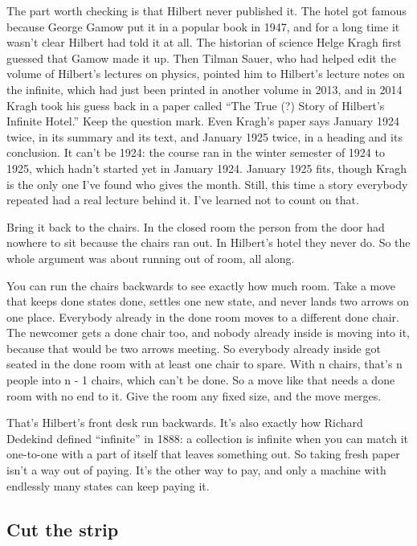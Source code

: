 \documentclass[11pt,twoside]{article}
\theoremstyle{thielethm}
\theoremstyle{thieledef}
\theoremstyle{thieledef}
\theoremstyle{thieledef}
\theoremstyle{thielethm}
\theoremstyle{thieleobs}
\theoremstyle{thielethm}
\begin{document}
The part worth checking is that Hilbert never published it. The hotel got famous because George Gamow put it in a popular book in 1947, and for a long time it wasn't clear Hilbert had told it at all. The historian of science Helge Kragh first guessed that Gamow made it up. Then Tilman Sauer, who had helped edit the volume of Hilbert's lectures on physics, pointed him to Hilbert's lecture notes on the infinite, which had just been printed in another volume in 2013, and in 2014 Kragh took his guess back in a paper called ``The True (?) Story of Hilbert's Infinite Hotel.'' Keep the question mark. Even Kragh's paper says January 1924 twice, in its summary and its text, and January 1925 twice, in a heading and its conclusion. It can't be 1924: the course ran in the winter semester of 1924 to 1925, which hadn't started yet in January 1924. January 1925 fits, though Kragh is the only one I've found who gives the month. Still, this time a story everybody repeated had a real lecture behind it. I've learned not to count on that.

Bring it back to the chairs. In the closed room the person from the door had nowhere to sit because the chairs ran out. In Hilbert's hotel they never do. So the whole argument was about running out of room, all along.

You can run the chairs backwards to see exactly how much room. Take a move that keeps done states done, settles one new state, and never lands two arrows on one place. Everybody already in the done room moves to a different done chair. The newcomer gets a done chair too, and nobody already inside is moving into it, because that would be two arrows meeting. So everybody already inside got seated in the done room with at least one chair to spare. With n chairs, that's n people into n - 1 chairs, which can't be done. So a move like that needs a done room with no end to it. Give the room any fixed size, and the move merges.

That's Hilbert's front desk run backwards. It's also exactly how Richard Dedekind defined ``infinite'' in 1888: a collection is infinite when you can match it one-to-one with a part of itself that leaves something out. So taking fresh paper isn't a way out of paying. It's the other way to pay, and only a machine with endlessly many states can keep paying it.

\subsection{Cut the strip}
\end{document}
